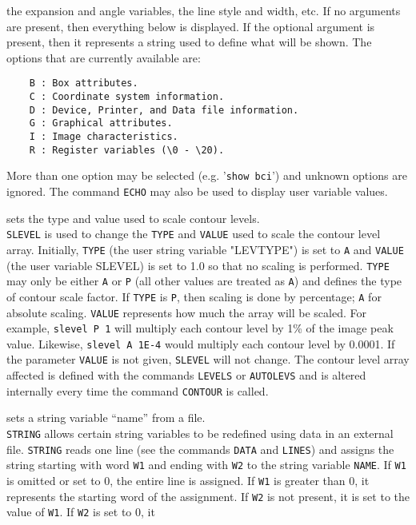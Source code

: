 	the expansion and angle variables, the line style and width, etc.
	If no arguments are present, then everything below is displayed.
	If the optional argument is present, then it represents a string
	used to define what will be shown.  The options that are currently
	available are:
	\begin{verbatim}
    B : Box attributes.
    C : Coordinate system information.
    D : Device, Printer, and Data file information.
    G : Graphical attributes.
    I : Image characteristics.
    R : Register variables (\0 - \20).
	\end{verbatim}
	More than one option may be selected (e.g. '{\tt show bci}')
	and unknown options are ignored.  The command
	{\tt ECHO} may also be used to display
	user variable values.
\item [{\tt SLEVEL type [value] } --] sets the type and value used to scale contour levels.\\
	{\tt SLEVEL} is used to change the {\tt TYPE} and
	{\tt VALUE} used to scale the contour level array.
	Initially, {\tt TYPE} (the user string variable "LEVTYPE")
	is set to {\tt A} and {\tt VALUE} (the user variable
	SLEVEL) is set to 1.0 so that no scaling is performed.
	{\tt TYPE} may only be either {\tt A} or {\tt P}
	(all other values are treated as {\tt A}) and defines the
	type of contour scale factor.  If {\tt TYPE} is {\tt P},
	then scaling is done by percentage; {\tt A} for absolute
	scaling.  {\tt VALUE} represents how much the array will
	be scaled.  For example, {\tt slevel P 1} will multiply
	each contour level by 1\% of the image peak value.  Likewise,
	{\tt slevel A 1E-4} would multiply each contour level
	by 0.0001.  If the parameter {\tt VALUE} is not given,
	{\tt SLEVEL} will not change.  The contour level array
	affected is defined with the commands
	{\tt LEVELS} or
	{\tt AUTOLEVS}
	and is altered internally every time the command
	{\tt CONTOUR} is called.
\item [{\tt STRING name [W1 [W2]] } --] sets a string variable ``name'' from a file.\\
	{\tt STRING} allows certain string variables to be
	redefined using data in an external file.  {\tt STRING}
	reads one line (see the commands {\tt DATA}
	and {\tt LINES}) and assigns the string
	starting with word {\tt W1} and ending with {\tt W2}
	to the string variable {\tt NAME}.  If {\tt W1} is
	omitted or set to 0, the entire line is assigned.  If {\tt W1}
	is greater than 0, it represents the starting word of the
	assignment.  If {\tt W2} is not present, it is set to the
	value of {\tt W1}.  If {\tt W2} is set to 0, it
